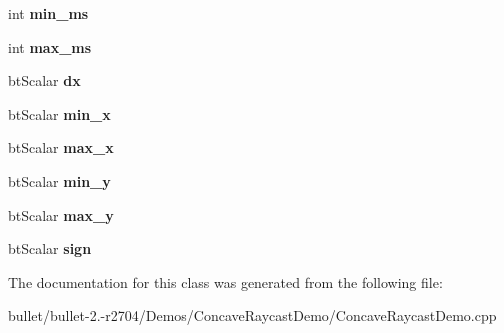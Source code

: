 \begin{DoxyCompactItemize}
\item 
\hypertarget{classbt_raycast_bar_ac3e98b8fd01904565c9937215bb7e3bb}{int {\bfseries min\+\_\+ms}}\label{classbt_raycast_bar_ac3e98b8fd01904565c9937215bb7e3bb}

\item 
\hypertarget{classbt_raycast_bar_ac5f45b682f21acaa59ed4ef0024211f1}{int {\bfseries max\+\_\+ms}}\label{classbt_raycast_bar_ac5f45b682f21acaa59ed4ef0024211f1}

\item 
\hypertarget{classbt_raycast_bar_a5ad2521045a054194ee7600ceb5e2de7}{bt\+Scalar {\bfseries dx}}\label{classbt_raycast_bar_a5ad2521045a054194ee7600ceb5e2de7}

\item 
\hypertarget{classbt_raycast_bar_a215a9a9f0f1e77eef6f143de2d8b1883}{bt\+Scalar {\bfseries min\+\_\+x}}\label{classbt_raycast_bar_a215a9a9f0f1e77eef6f143de2d8b1883}

\item 
\hypertarget{classbt_raycast_bar_a2f919b4a064a4e699ea1e232de024519}{bt\+Scalar {\bfseries max\+\_\+x}}\label{classbt_raycast_bar_a2f919b4a064a4e699ea1e232de024519}

\item 
\hypertarget{classbt_raycast_bar_a9a6098e308a760b06f662ca839b3c0b0}{bt\+Scalar {\bfseries min\+\_\+y}}\label{classbt_raycast_bar_a9a6098e308a760b06f662ca839b3c0b0}

\item 
\hypertarget{classbt_raycast_bar_ac681b3e8ed99befaf7b3231a0b0698d3}{bt\+Scalar {\bfseries max\+\_\+y}}\label{classbt_raycast_bar_ac681b3e8ed99befaf7b3231a0b0698d3}

\item 
\hypertarget{classbt_raycast_bar_af24830e17e519acdd3c45b743d825668}{bt\+Scalar {\bfseries sign}}\label{classbt_raycast_bar_af24830e17e519acdd3c45b743d825668}

\end{DoxyCompactItemize}


The documentation for this class was generated from the following file\+:\begin{DoxyCompactItemize}
\item 
bullet/bullet-\/2.-\/r2704/\+Demos/\+Concave\+Raycast\+Demo/Concave\+Raycast\+Demo.\+cpp\end{DoxyCompactItemize}
